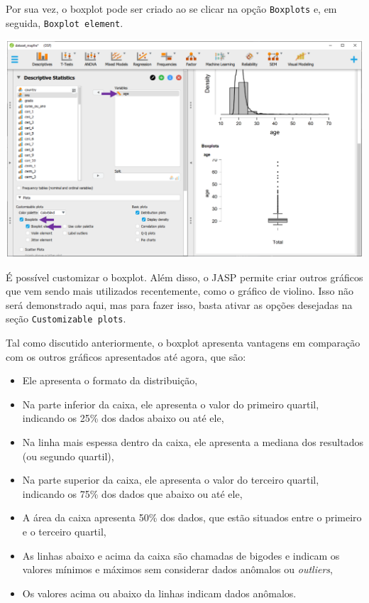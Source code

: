 \documentclass[
]{book}
\providecommand{\tightlist}{%
  \setlength{\itemsep}{0pt}\setlength{\parskip}{0pt}}
\begin{document}
Por sua vez, o boxplot pode ser criado ao se clicar na opção
\texttt{Boxplots} e, em seguida, \texttt{Boxplot\ element}.

\includegraphics{./img/cap_desc_jasp_grafico_boxplot.png}

É possível customizar o boxplot. Além disso, o JASP permite criar outros
gráficos que vem sendo mais utilizados recentemente, como o gráfico de
violino. Isso não será demonstrado aqui, mas para fazer isso, basta
ativar as opções desejadas na seção \texttt{Customizable\ plots}.

Tal como discutido anteriormente, o boxplot apresenta vantagens em
comparação com os outros gráficos apresentados até agora, que são:

\begin{itemize}
\tightlist
\item
  Ele apresenta o formato da distribuição,\\
\item
  Na parte inferior da caixa, ele apresenta o valor do primeiro quartil,
  indicando os 25\% dos dados abaixo ou até ele,\\
\item
  Na linha mais espessa dentro da caixa, ele apresenta a mediana dos
  resultados (ou segundo quartil),\\
\item
  Na parte superior da caixa, ele apresenta o valor do terceiro quartil,
  indicando os 75\% dos dados que abaixo ou até ele,\\
\item
  A área da caixa apresenta 50\% dos dados, que estão situados entre o
  primeiro e o terceiro quartil,\\
\item
  As linhas abaixo e acima da caixa são chamadas de bigodes e indicam os
  valores mínimos e máximos sem considerar dados anômalos ou
  \emph{outliers},\\
\item
  Os valores acima ou abaixo da linhas indicam dados anômalos.
\end{itemize}
\end{document}
